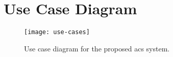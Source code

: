 \section{Use Case Diagram}\label{sec:use-case-diagram}
% 
\begin{figure}[H]
    \centering
    \texttt{[image: use-cases]}
    \caption{Use case diagram for the proposed \acrshort{acs} system.}
    \label{fig:use-case-diagram}
\end{figure}